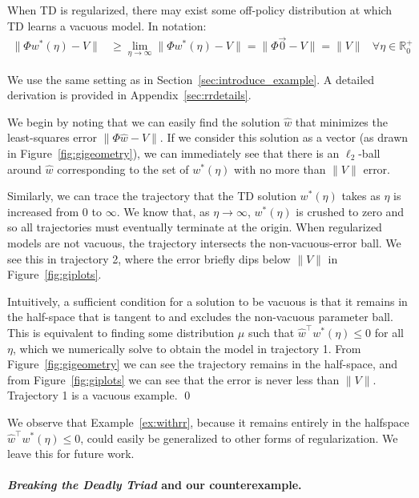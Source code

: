 \begin{example}
  \label{ex:withrr}
  When TD is regularized, there may exist some off-policy distribution at which TD learns a vacuous model. In notation:
  \begin{align}
    \|\Phi w^*(\eta) - V\| & \geq \lim_{\eta\to\infty} \|\Phi w^*(\eta) - V \| = \|\Phi \vec 0 - V \| = \|V \| & \forall \eta\in\mathbb{R}_0^+ \label{eqn:vacuoustd}
  \end{align}

  \vspace{-1.25em}
  \proof We use the same setting as in Section~\ref{sec:introduce_example}. A detailed derivation is provided in Appendix~\ref{sec:rrdetails}.

  We begin by noting that we can easily find the solution $\hat w$ that minimizes the least-squares error $\|\Phi \hat w - V\|$. If we consider this solution as a vector (as drawn in Figure~\ref*{fig:gigeometry}), we can immediately see that there is an $\ell_2$-ball around $\hat w$ corresponding to the set of $w^*(\eta)$ with no more than $\|V\|$ error.

  Similarly, we can trace the trajectory that the TD solution $w^*(\eta)$ takes as $\eta$ is increased from 0 to $\infty$. We know that, as $\eta\to\infty$, $w^*(\eta)$ is crushed to zero and so all trajectories must eventually terminate at the origin. When regularized models are not vacuous, the trajectory intersects the non-vacuous-error ball. We see this in trajectory 2, where the error briefly dips below $\|V\|$ in Figure~\ref{fig:giplots}.

  Intuitively, a sufficient condition for a solution to be vacuous is that it remains in the half-space that is tangent to and excludes the non-vacuous parameter ball. This is equivalent to finding some distribution $\mu$ such that $\hat w^\top w^*(\eta) \leq 0$ for all $\eta$, which we numerically solve to obtain the model in trajectory 1. From Figure~\ref{fig:gigeometry} we can see the trajectory remains in the half-space, and from Figure~\ref{fig:giplots} we can see that the error is never less than $\|V\|$. Trajectory 1 is a vacuous example. \qed
\end{example}

We observe that Example~\ref*{ex:withrr}, because it remains entirely in the halfspace $\hat w^\top w^*(\eta) \leq 0$, could easily be generalized to other forms of regularization. We leave this for future work.


\paragraph{\emph{Breaking the Deadly Triad} and our counterexample.}

